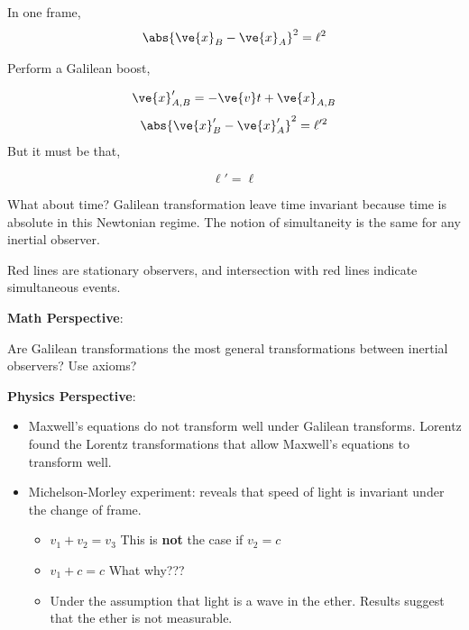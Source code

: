 \documentclass{article}
\newcommand{\heading}[1]{\vspace{0.1in}\textbf{#1}:}
\begin{document}
In one frame,
\[ \abs{\ve{x}_B - \ve{x}_A }^2 = \ell^2 \]

Perform a Galilean boost,

\[ \ve{x}'_{A,B} = -\ve{v}t + \ve{x}_{A,B} \]
\[ \abs{\ve{x}'_B - \ve{x}'_A }^2 = \ell'^2 \]
But it must be that,

\[ \ell' = \ell \]

What about time? Galilean transformation leave time invariant because time is absolute in this Newtonian regime. The notion of simultaneity is the same for any inertial observer.


\begin{center}
\end{center}

Red lines are stationary observers, and intersection with red lines indicate simultaneous events.

\heading{Math Perspective}

Are Galilean transformations the most general transformations between inertial observers? Use axioms?

\heading{Physics Perspective}

\begin{itemize}
    \item Maxwell's equations do not transform well under Galilean transforms. Lorentz found the Lorentz transformations that allow Maxwell's equations to transform well.
    \item Michelson-Morley experiment: reveals that speed of light is invariant under the change of frame.
    \begin{itemize}
        \item $v_1 + v_2 = v_3$ This is \textbf{not} the case if $v_2 = c$
        \item $v_1 + c = c$ What why???
        \item Under the assumption that light is a wave in the ether. Results suggest that the ether is not measurable.
    \end{itemize}
\end{itemize}
\end{document}
